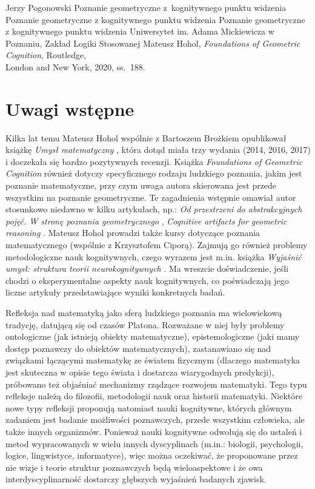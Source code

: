 \begin{newrevengenv}{Jerzy Pogonowski}
	{Poznanie geometryczne z~kognitywnego punktu widzenia}
	{Poznanie geometryczne z kognitywnego punktu widzenia}
	{Poznanie geometryczne z kognitywnego punktu widzenia}
	{Uniwersytet im. Adama Mickiewicza w Poznaniu, Zakład Logiki Stosowanej}
	{Mateusz Hohol, {\em Foundations of Geometric Cognition},
	Routledge,\\
	London and New York, 2020, ss.~188.}








\section{Uwagi wstępne}

Kilka lat temu Mateusz Hohol wspólnie z Bartoszem Brożkiem
opublikował książkę {\em Umysł matematyczny} \parencite{brozek_umysl_2014},
która dotąd miała trzy wydania (2014, 2016, 2017) i
doczekała się bardzo pozytywnych recenzji. Książka {\em
Foundations of Geometric Cognition} również dotyczy specyficznego
rodzaju ludzkiego poznania, jakim jest poznanie matematyczne, przy
czym uwaga autora skierowana jest przede wszystkim na poznanie
geometryczne. Te zagadnienia wstępnie omawiał autor stosunkowo
niedawno w kilku artykułach, np.: \textit{Od przestrzeni do
abstrakcyjnych pojęć. W stronę poznania geometrycznego} \parencite[, 
tekst odczytu wygłoszonego na V Konferencji Filozofii Matematyki i Informatyki, 
Poznań, 2016]{hohol_od_2018}, \textit{Cognitive artifacts for
geometric reasoning} \parencite{hohol_cognitive_2019}. Mateusz Hohol
prowadzi także kursy dotyczące poznania matematycznego (wspólnie z
Krzysztofem Ciporą). Zajmują go również problemy metodologiczne
nauk kognitywnych, czego wyrazem jest m.in. książka {\em Wyjaśnić
umysł: struktura teorii neurokognitywnych} \parencite{hohol_wyjasnic_2013}. Ma
wreszcie doświadczenie, jeśli chodzi o eksperymentalne aspekty
nauk kognitywnych, co poświadczają jego liczne artykuły
przedstawiające wyniki konkretnych badań.

Refleksja nad matematyką jako sferą ludzkiego poznania ma
wielowiekową tradycję, datującą się od czasów Platona. Rozważane w
niej były problemy ontologiczne (jak istnieją obiekty
matematyczne), epistemologiczne (jaki mamy dostęp poznawczy do
obiektów matematycznych), zastanawiano się nad związkami łączącymi
matematykę ze światem fizycznym (dlaczego matematyka jest
skuteczna w opisie tego świata i dostarcza wiarygodnych
predykcji), próbowano też objaśniać mechanizmy rządzące rozwojem
matematyki. Tego typu refleksje należą do filozofii, metodologii
nauk oraz historii matematyki. Niektóre nowe typy refleksji
proponują natomiast nauki kognitywne, których głównym zadaniem
jest badanie możliwości poznawczych, przede wszystkim człowieka,
ale także innych organizmów. Ponieważ nauki kognitywne odwołują
się do ustaleń i metod wypracowanych w wielu innych dyscyplinach
(m.in.: biologii, psychologii, logice, lingwistyce, informatyce),
więc można oczekiwać, że proponowane przez nie wizje i teorie
struktur poznawczych będą wieloaspektowe i że owa
interdyscyplinarność dostarczy głębszych wyjaśnień badanych
zjawisk.


\end{newrevengenv}
